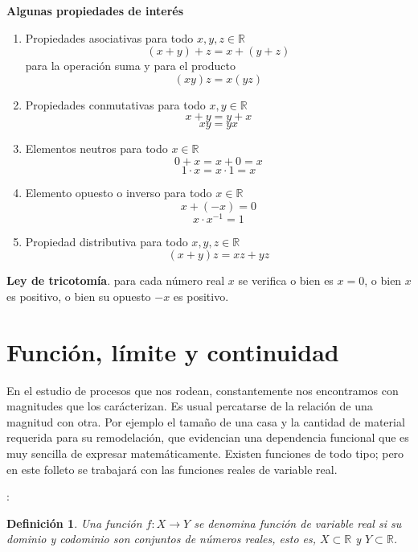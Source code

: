 \documentclass[10pt,twoside]{SelfArx} %
\begin{document}
\textbf{Algunas propiedades de interés}\\
\begin{enumerate}
	\item Propiedades asociativas para todo $ x,y,z\in \mathbb{R} $
	\[ (x+y)+z=x+(y+z) \]
	para la operación suma y para el producto
	\[ (xy)z=x(yz) \]
	\item Propiedades conmutativas para todo $ x,y\in \mathbb{R} $
	\[ x+y=y+x \]
	\[ xy=yx \]
	\item Elementos neutros para todo $ x\in \mathbb{R} $
	\[ 0+x=x+0=x \]
	\[ 1\cdot x=x\cdot 1=x \]
	\item Elemento opuesto o inverso para todo $ x\in \mathbb{R} $
	\[ x+(-x)=0 \]
	\[ x\cdot x^{-1}=1 \]
	\item Propiedad distributiva para todo $ x,y,z\in \mathbb{R} $
	\[ (x+y)z=xz+yz \]
\end{enumerate}
\textbf{Ley de tricotom\'ia}. para cada número real $ x $ se verifica o bien es $ x=0 $, o bien $ x $ es positivo, o bien su opuesto $ -x $ es positivo.
\newpage
\section{Funci\'on, l\'imite y continuidad}

En el estudio de procesos que nos rodean, constantemente nos encontramos con magnitudes que los carácterizan. Es usual percatarse de la relación de una magnitud con otra. Por ejemplo el tamaño de una casa y la cantidad de material requerida para su remodelación, que evidencian una dependencia funcional que es muy sencilla de expresar matemáticamente. Existen funciones de todo tipo; pero en este folleto se trabajará con las funciones reales de variable real.\\


\newtheorem{thm}{Definici\'on}:
\begin{thm}\label{func_real}
	Una funci\'on $ f:X\rightarrow Y $ se denomina \textit{función de variable real } si su dominio y codominio son conjuntos de números reales, esto es, $ X\subset\mathbb{R} $ y $ Y\subset\mathbb{R} $.
\end{thm}
\end{document}
